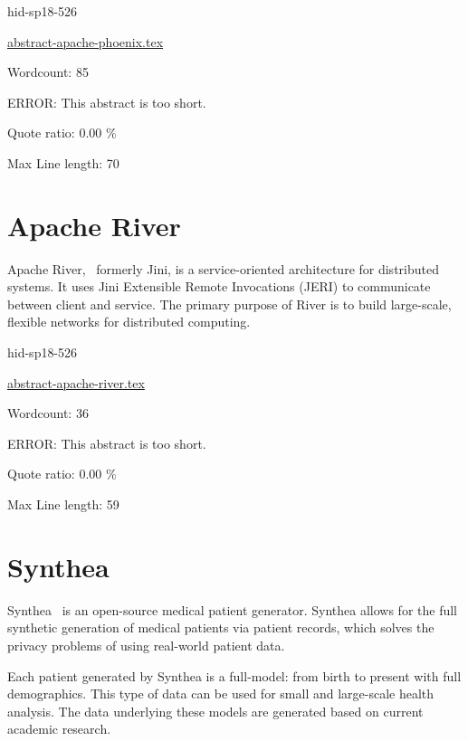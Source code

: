 \begin{IU}

hid-sp18-526

\href{https://github.com/cloudmesh-community/hid-sp18-526/blob/master//technology/abstract-apache-phoenix.tex}{abstract-apache-phoenix.tex}

 

Wordcount: 85

ERROR: This abstract is too short.


Quote ratio: 0.00 \%
 
Max Line length: 70
\end{IU}

\section{Apache River}

Apache River,~\cite{hid-sp18-www-526-apache-river} formerly
Jini, is a service-oriented architecture for distributed
systems. It uses Jini Extensible Remote Invocations (JERI)
to communicate between client and service. The primary 
purpose of River is to build large-scale, flexible networks
for distributed computing.



\begin{IU}

hid-sp18-526

\href{https://github.com/cloudmesh-community/hid-sp18-526/blob/master//technology/abstract-apache-river.tex}{abstract-apache-river.tex}

 

Wordcount: 36

ERROR: This abstract is too short.


Quote ratio: 0.00 \%
 
Max Line length: 59
\end{IU}

\section{Synthea}

Synthea~\cite{hid-sp18-526-www-synthea} is an open-source
medical patient generator. Synthea allows for the full synthetic
generation of medical patients via patient records, which solves
the privacy problems of using real-world patient data.

Each patient generated by Synthea is a full-model: from birth
to present with full demographics. This type of data can be used
for small and large-scale health analysis. The data underlying
these models are generated based on current academic research.


